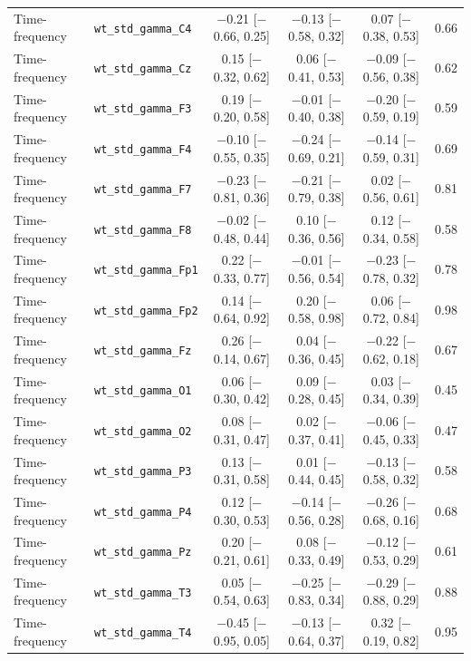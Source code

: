 {\begin{longtable}{llcccc}
Time-frequency & \texttt{wt\_std\_gamma\_C4} & $-$0.21 [$-$0.66, 0.25] & $-$0.13 [$-$0.58, 0.32] & 0.07 [$-$0.38, 0.53] & 0.66 \\
Time-frequency & \texttt{wt\_std\_gamma\_Cz} & 0.15 [$-$0.32, 0.62] & 0.06 [$-$0.41, 0.53] & $-$0.09 [$-$0.56, 0.38] & 0.62 \\
Time-frequency & \texttt{wt\_std\_gamma\_F3} & 0.19 [$-$0.20, 0.58] & $-$0.01 [$-$0.40, 0.38] & $-$0.20 [$-$0.59, 0.19] & 0.59 \\
Time-frequency & \texttt{wt\_std\_gamma\_F4} & $-$0.10 [$-$0.55, 0.35] & $-$0.24 [$-$0.69, 0.21] & $-$0.14 [$-$0.59, 0.31] & 0.69 \\
Time-frequency & \texttt{wt\_std\_gamma\_F7} & $-$0.23 [$-$0.81, 0.36] & $-$0.21 [$-$0.79, 0.38] & 0.02 [$-$0.56, 0.61] & 0.81 \\
Time-frequency & \texttt{wt\_std\_gamma\_F8} & $-$0.02 [$-$0.48, 0.44] & 0.10 [$-$0.36, 0.56] & 0.12 [$-$0.34, 0.58] & 0.58 \\
Time-frequency & \texttt{wt\_std\_gamma\_Fp1} & 0.22 [$-$0.33, 0.77] & $-$0.01 [$-$0.56, 0.54] & $-$0.23 [$-$0.78, 0.32] & 0.78 \\
Time-frequency & \texttt{wt\_std\_gamma\_Fp2} & 0.14 [$-$0.64, 0.92] & 0.20 [$-$0.58, 0.98] & 0.06 [$-$0.72, 0.84] & 0.98 \\
Time-frequency & \texttt{wt\_std\_gamma\_Fz} & 0.26 [$-$0.14, 0.67] & 0.04 [$-$0.36, 0.45] & $-$0.22 [$-$0.62, 0.18] & 0.67 \\
Time-frequency & \texttt{wt\_std\_gamma\_O1} & 0.06 [$-$0.30, 0.42] & 0.09 [$-$0.28, 0.45] & 0.03 [$-$0.34, 0.39] & 0.45 \\
Time-frequency & \texttt{wt\_std\_gamma\_O2} & 0.08 [$-$0.31, 0.47] & 0.02 [$-$0.37, 0.41] & $-$0.06 [$-$0.45, 0.33] & 0.47 \\
Time-frequency & \texttt{wt\_std\_gamma\_P3} & 0.13 [$-$0.31, 0.58] & 0.01 [$-$0.44, 0.45] & $-$0.13 [$-$0.58, 0.32] & 0.58 \\
Time-frequency & \texttt{wt\_std\_gamma\_P4} & 0.12 [$-$0.30, 0.53] & $-$0.14 [$-$0.56, 0.28] & $-$0.26 [$-$0.68, 0.16] & 0.68 \\
Time-frequency & \texttt{wt\_std\_gamma\_Pz} & 0.20 [$-$0.21, 0.61] & 0.08 [$-$0.33, 0.49] & $-$0.12 [$-$0.53, 0.29] & 0.61 \\
Time-frequency & \texttt{wt\_std\_gamma\_T3} & 0.05 [$-$0.54, 0.63] & $-$0.25 [$-$0.83, 0.34] & $-$0.29 [$-$0.88, 0.29] & 0.88 \\
Time-frequency & \texttt{wt\_std\_gamma\_T4} & $-$0.45 [$-$0.95, 0.05] & $-$0.13 [$-$0.64, 0.37] & 0.32 [$-$0.19, 0.82] & 0.95 \\

\end{longtable}}
